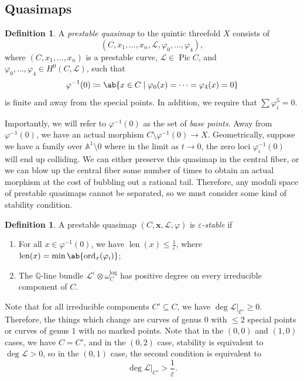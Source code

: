 \documentclass{amsart}
\theoremstyle{definition}
\newtheorem{defn}[thm]{Definition}
\theoremstyle{remark}
\theoremstyle{plain}
\theoremstyle{definition}
\theoremstyle{remark}
\newcommand{\A}{\mathbb{A}}
\newcommand{\Q}{\mathbb{Q}}
\newcommand{\ep}{\varepsilon}
\newcommand{\mc}[1]{\mathcal{#1}}
\newcommand{\on}[1]{\operatorname{#1}}
\newcommand{\1}{\mathbf{1}}
\newcommand{\2}{\mathbf{2}}
\newcommand{\3}{\mathbf{3}}
\DeclareMathOperator{\Pic}{Pic}
\begin{document}
\subsection{Quasimaps}%
\label{sub:Quasimaps}

\begin{defn}
    A \textit{prestable quasimap} to the quintic threefold \(X\) consists of 
    \[(C, x_1, \ldots, x_n, \mc{L}, \varphi_0, \ldots, \varphi_4),\] 
    where \((C, x_1, \ldots, x_n)\) is a prestable curve, \(\mc{L} \in \Pic C\), and \(\varphi_0, \ldots, \varphi_4 \in H^0(C, \mc{L})\), such that
    \[ \varphi^{-1}(0) \coloneqq \ab\{x \in C \mid \varphi_0(x) = \cdots = \varphi_4(x) = 0 \} \]
    is finite and away from the special points. In addition, we require that \(\sum \varphi_i^5 = 0\).
\end{defn}

Importantly, we will refer to \(\varphi^{-1}(0)\) as the set of \textit{base points}. Away from \(\varphi^{-1}(0)\), we have an actual morphism \(C \setminus \varphi^{-1}(0) \to X\). Geometrically, suppose we have a family over \(\A^1 \setminus 0\) where in the limit as \(t \to 0\), the zero loci \(\varphi_i^{-1}(0)\) will end up colliding. We can either preserve this quasimap in the central fiber, or we can blow up the central fiber some number of times to obtain an actual morphism at the cost of bubbling out a rational tail. Therefore, any moduli space of prestable quasimaps cannot be separated, so we must consider some kind of stability condition.

\begin{defn}
    A prestable quasimap \((C, \mathbf{x}, \mc{L}, \varphi)\) is \textit{\(\ep\)-stable} if
    \begin{enumerate}
        \item For all \(x \in \varphi^{-1}(0)\), we have \(\on{len}(x) \leq \frac{1}{\ep}\), where \(\on{len}(x) = \min \ab\{ \on{ord}_x (\varphi_i)\}\);
        \item The \(\Q\)-line bundle \(\mc{L}^{\ep} \otimes \omega_C^{\log}\) has positive degree on every irreducible component of \(C\).
    \end{enumerate}
\end{defn}

Note that for all irreducible components \(C' \subseteq C\), we have \(\deg \mc{L}|_{\mc{C}'} \geq 0\). Therefore, the things which change are curves of genus \(0\) with \(\leq 2\) special points or curves of genus \(1\) with no marked points. Note that in the \((0,0)\) and \((1,0)\) cases, we have \(C = C'\), and in the \((0,2)\) case, stability is equivalent to \(\deg \mc{L} > 0\), so in the \((0,1)\) case, the second condition is equivalent to 
\[ \deg \mc{L}|_{C'} > \frac{1}{\ep}. \]
\end{document}
